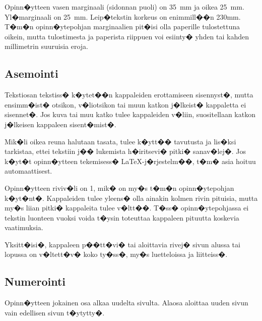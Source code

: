\documentclass[finnish,12pt,a4paper,pdftex]{article}
\begin{document}
Opinn�ytteen vasen marginaali (sidonnan puoli) on
35~mm %
ja oikea 25~mm. Yl�marginaali on 25~mm. Leip�tekstin korkeus on
enimmill��n 230mm. T�m�n opinn�ytepohjan marginaalien pit�isi olla
paperille tulostettuna oikein, mutta tulostimesta ja paperista
riippuen voi esiinty� yhden tai kahden millimetrin suuruisia eroja.
\subsection*{Asemointi}

Tekstiosan tekstiss� k�ytet��n kappaleiden erottamiseen sisennyst�,
mutta ensimm�ist� otsikon, v�liotsikon tai muun katkon j�lkeist�
kappaletta ei sisennet�. Jos kuva tai muu katko tulee kappaleiden
v�liin, suositellaan katkon j�lkeisen kappaleen sisent�mist�.

Mik�li oikea reuna halutaan tasata, tulee k�ytt�� tavutusta ja lis�ksi
tarkistaa, ettei tekstiin j�� lukemista h�iritsevi� pitki� sanav�lej�. Jos
k�yt�t opinn�ytteen tekemisess� \LaTeX-j�rjestelm��, 
t�m� asia hoituu automaattisest.

Opinn�ytteen riviv�li on 1, mik� on my�s t�m�n opinn�ytepohjan k�yt�nt�. 
Kappaleiden tulee yleens� olla ainakin kolmen rivin pituisia, mutta
my�s liian pitki� kappaleita tulee v�ltt��.  T�ss� opinn�ytepohjassa
ei tekstin luonteen vuoksi voida t�ysin toteuttaa kappaleen pituutta koskevia
vaatimuksia.

Yksitt�isi�, kappaleen p��tt�vi� tai aloittavia rivej� sivun alussa
tai lopussa on v�ltett�v� koko ty�ss�, my�s luetteloissa ja
liitteiss�.

\subsection*{Numerointi}

Opinn�ytteen jokainen osa alkaa uudelta sivulta. Alaosa aloittaa uuden
sivun vain edellisen sivun t�ytytty�.
\end{document}
